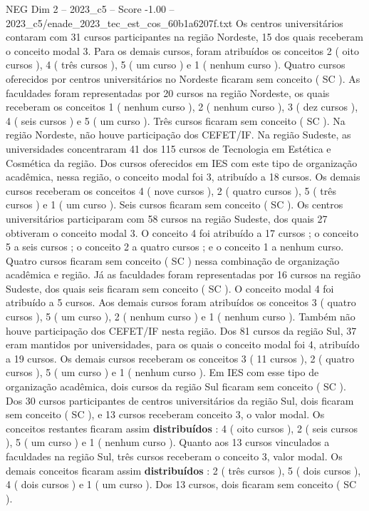 \begin{textsample}{NEG Dim 2 – 2023\_c5 – Score -1.00 – 2023\_c5/enade\_2023\_tec\_est\_cos\_60b1a6207f.txt}
Os centros universitários contaram com 31 cursos participantes na região Nordeste, 15 dos quais receberam o conceito modal 3.
Para os demais cursos, foram atribuídos os conceitos 2 ( oito cursos ), 4 ( três cursos ), 5 ( um curso ) e 1 ( nenhum curso ).
Quatro cursos oferecidos por centros universitários no Nordeste ficaram sem conceito ( SC ).
As faculdades foram representadas por 20 cursos na região Nordeste, os quais receberam os conceitos 1 ( nenhum curso ), 2 ( nenhum curso ), 3 ( dez cursos ), 4 ( seis cursos ) e 5 ( um curso ).
Três cursos ficaram sem conceito ( SC ).
Na região Nordeste, não houve participação dos CEFET/IF.
Na região Sudeste, as universidades concentraram 41 dos 115 cursos de Tecnologia em Estética e Cosmética da região.
Dos cursos oferecidos em IES com este tipo de organização acadêmica, nessa região, o conceito modal foi 3, atribuído a 18 cursos.
Os demais cursos receberam os conceitos 4 ( nove cursos ), 2 ( quatro cursos ), 5 ( três cursos ) e 1 ( um curso ).
Seis cursos ficaram sem conceito ( SC ).
Os centros universitários participaram com 58 cursos na região Sudeste, dos quais 27 obtiveram o conceito modal 3.
O conceito 4 foi atribuído a 17 cursos ; o conceito 5 a seis cursos ; o conceito 2 a quatro cursos ; e o conceito 1 a nenhum curso.
Quatro cursos ficaram sem conceito ( SC ) nessa combinação de organização acadêmica e região.
Já as faculdades foram representadas por 16 cursos na região Sudeste, dos quais seis ficaram sem conceito ( SC ).
O conceito modal 4 foi atribuído a 5 cursos.
Aos demais cursos foram atribuídos os conceitos 3 ( quatro cursos ), 5 ( um curso ), 2 ( nenhum curso ) e 1 ( nenhum curso ).
Também não houve participação dos CEFET/IF nesta região.
Dos 81 cursos da região Sul, 37 eram mantidos por universidades, para os quais o conceito modal foi 4, atribuído a 19 cursos.
Os demais cursos receberam os conceitos 3 ( 11 cursos ), 2 ( quatro cursos ), 5 ( um curso ) e 1 ( nenhum curso ).
Em IES com esse tipo de organização acadêmica, dois cursos da região Sul ficaram sem conceito ( SC ).
Dos 30 cursos participantes de centros universitários da região Sul, dois ficaram sem conceito ( SC ), e 13 cursos receberam conceito 3, o valor modal.
Os conceitos restantes ficaram assim \textbf{distribuídos} : 4 ( oito cursos ), 2 ( seis cursos ), 5 ( um curso ) e 1 ( nenhum curso ).
Quanto aos 13 cursos vinculados a faculdades na região Sul, três cursos receberam o conceito 3, valor modal.
Os demais conceitos ficaram assim \textbf{distribuídos} : 2 ( três cursos ), 5 ( dois cursos ), 4 ( dois cursos ) e 1 ( um curso ).
Dos 13 cursos, dois ficaram sem conceito ( SC ).

\end{textsample}

